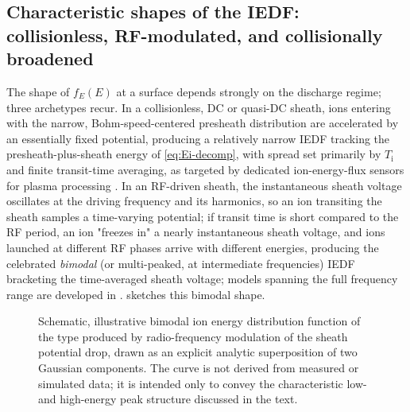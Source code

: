 \subsection{Characteristic shapes of the IEDF: collisionless, RF-modulated, and collisionally broadened}

The shape of $f_E(E)$ at a surface depends strongly on the discharge regime; three archetypes recur. In a collisionless, DC or quasi-DC sheath, ions entering with the narrow, Bohm-speed-centered presheath distribution are accelerated by an essentially fixed potential, producing a relatively narrow IEDF tracking the presheath-plus-sheath energy of \cref{eq:Ei-decomp}, with spread set primarily by $T_{\mathrm{i}}$ and finite transit-time averaging, as targeted by dedicated ion-energy-flux sensors for plasma processing \cite{ref0075}. In an RF-driven sheath, the instantaneous sheath voltage oscillates at the driving frequency and its harmonics, so an ion transiting the sheath samples a time-varying potential; if transit time is short compared to the RF period, an ion "freezes in" a nearly instantaneous sheath voltage, and ions launched at different RF phases arrive with different energies, producing the celebrated \emph{bimodal} (or multi-peaked, at intermediate frequencies) IEDF bracketing the time-averaged sheath voltage; models spanning the full frequency range are developed in \cite{ref0123}.  sketches this bimodal shape.

\begin{figure}[htbp]
\centering
{}
\caption{Schematic, illustrative bimodal ion energy distribution function of the type produced by radio-frequency modulation of the sheath potential drop, drawn as an explicit analytic superposition of two Gaussian components. The curve is not derived from measured or simulated data; it is intended only to convey the characteristic low- and high-energy peak structure discussed in the text.}
\label{fig:iedf-bimodal}
\end{figure}

